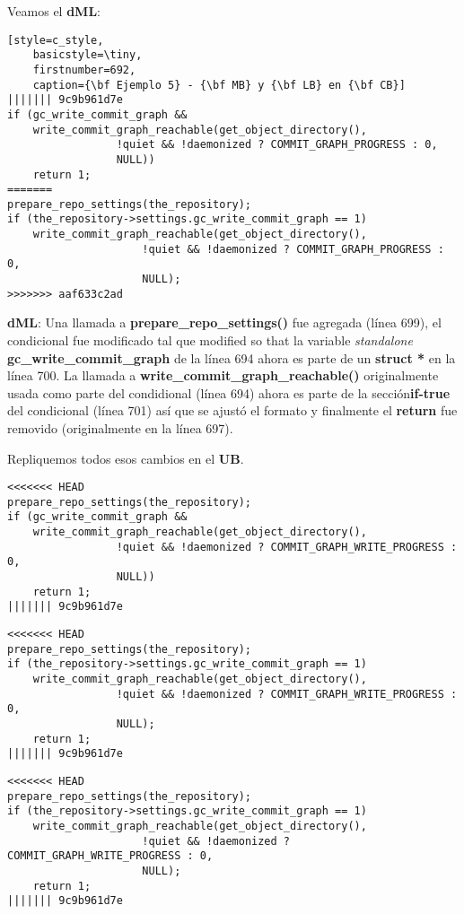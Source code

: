Veamos el {\bf dML}:

\begin{lstlisting}[style=c_style,
	basicstyle=\tiny,
	firstnumber=692,
	caption={\bf Ejemplo 5} - {\bf MB} y {\bf LB} en {\bf CB}]
||||||| 9c9b961d7e
if (gc_write_commit_graph &&
    write_commit_graph_reachable(get_object_directory(),
				 !quiet && !daemonized ? COMMIT_GRAPH_PROGRESS : 0,
				 NULL))
	return 1;
=======
prepare_repo_settings(the_repository);
if (the_repository->settings.gc_write_commit_graph == 1)
	write_commit_graph_reachable(get_object_directory(),
				     !quiet && !daemonized ? COMMIT_GRAPH_PROGRESS : 0,
				     NULL);
>>>>>>> aaf633c2ad
\end{lstlisting}

{\bf dML}: Una llamada a {\bf prepare\_repo\_settings()} fue agregada (línea 699), el condicional fue modificado tal que modified
so that la variable {\it standalone} {\bf gc\_write\_commit\_graph} de la línea 694 ahora es parte de un {\bf struct * } en
la línea 700. La llamada a {\bf write\_commit\_graph\_reachable()} originalmente usada como parte del condidional (línea 694)
ahora es parte de la sección{\bf if-true} del condicional (línea 701) así que se ajustó el formato y finalmente el {\bf return}
fue removido (originalmente en la línea 697).

Repliquemos todos esos cambios en el {\bf UB}.

\begin{lstlisting}[style=c_style,
	basicstyle=\tiny,
	firstnumber=686,
	caption={\bf example 5} - Paso 1 - insertar llamada]
<<<<<<< HEAD
prepare_repo_settings(the_repository);
if (gc_write_commit_graph &&
    write_commit_graph_reachable(get_object_directory(),
				 !quiet && !daemonized ? COMMIT_GRAPH_WRITE_PROGRESS : 0,
				 NULL))
	return 1;
||||||| 9c9b961d7e
\end{lstlisting}

\begin{lstlisting}[style=c_style,
	basicstyle=\tiny,
	firstnumber=686,
	caption={\bf Ejemplo 5} - Paso 2 - ajustar condicional]
<<<<<<< HEAD
prepare_repo_settings(the_repository);
if (the_repository->settings.gc_write_commit_graph == 1)
    write_commit_graph_reachable(get_object_directory(),
				 !quiet && !daemonized ? COMMIT_GRAPH_WRITE_PROGRESS : 0,
				 NULL);
	return 1;
||||||| 9c9b961d7e
\end{lstlisting}

\begin{lstlisting}[style=c_style,
	basicstyle=\tiny,
	firstnumber=686,
	caption={\bf Ejemplo 5} - Paso 3 - ajustar formato]
<<<<<<< HEAD
prepare_repo_settings(the_repository);
if (the_repository->settings.gc_write_commit_graph == 1)
	write_commit_graph_reachable(get_object_directory(),
				     !quiet && !daemonized ? COMMIT_GRAPH_WRITE_PROGRESS : 0,
				     NULL);
	return 1;
||||||| 9c9b961d7e
\end{lstlisting}


